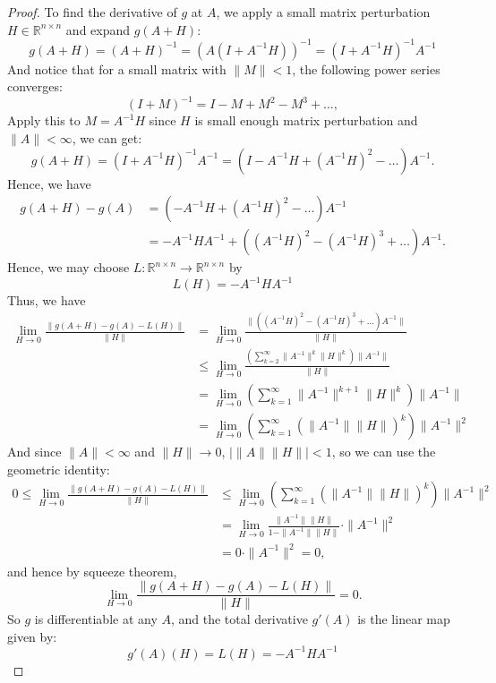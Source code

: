 \begin{proof}
    To find the derivative of $g$ at $A$, we apply a small matrix perturbation $H \in \mathbb{R}^{n \times n}$ and expand $g(A+H)$:
    \[
        g(A+H) = (A+H)^{-1} = (A(I+A^{-1}H))^{-1} = (I+A^{-1}H)^{-1}A^{-1}
    \]
    And notice that for a small matrix with $\| M \| < 1$, the following power series converges:
    \[
        (I + M)^{-1} = I - M + M^2 - M^3 + \dots,
    \]
    Apply this to $M = A^{-1}H$ since $H$ is small enough matrix perturbation and $\| A \| < \infty$, we can get:
    \[
        g(A+H) = (I+A^{-1}H)^{-1}A^{-1} = (I-A^{-1}H+(A^{-1}H)^2-\dots)A^{-1}.
    \]
    Hence, we have
    \[
        \begin{aligned}
            g(A+H)-g(A) &= (-A^{-1}H+(A^{-1}H)^2-\dots)A^{-1} \\ 
            &= -A^{-1}HA^{-1} + ((A^{-1}H)^2-(A^{-1}H)^3 +\dots)A^{-1}.
        \end{aligned}
    \]
    Hence, we may choose $L: \mathbb{R}^{n \times n} \to \mathbb{R}^{n \times n}$ by
    \[
        L(H) = -A^{-1}HA^{-1}
    \]
    Thus, we have
    \[
        \begin{aligned}
            \lim_{H \to 0} \frac{\|g(A+H) - g(A) - L(H) \|}{\| H \|} &= \lim_{H \to 0} \frac{\| ((A^{-1}H)^2-(A^{-1}H)^3 +\dots )A^{-1}\|}{\| H\|} \\
            &\le \lim_{H \to 0} \frac{(\sum_{k=2}^{\infty}\| A^{-1} \|^k\| H\|^k)\|A^{-1}\|}{\| H\|} \\
            &= \lim_{H \to 0} (\sum_{k=1}^{\infty}\| A^{-1} \|^{k+1}\| H\|^k)\|A^{-1}\| \\
            &= \lim_{H \to 0} (\sum_{k=1}^{\infty}(\| A^{-1} \|\| H\|)^k)\|A^{-1}\|^2
        \end{aligned}
    \]
    And since $\|A\| < \infty$ and $\| H\| \to 0$, $\lvert \| A\|\|H\| \rvert< 1$, so we can use the geometric identity:
    \[
        \begin{aligned}
            0 \le \lim_{H \to 0} \frac{\|g(A+H) - g(A) - L(H) \|}{\| H \|} &\le \lim_{H \to 0} (\sum_{k=1}^{\infty}(\| A^{-1} \|\| H\|)^k)\|A^{-1}\|^2 \\
            &= \lim_{H \to 0}\frac{\| A^{-1}\|\|H\|}{1-\| A^{-1}\|\|H\|} \cdot \| A^{-1}\|^2 \\
            &= 0 \cdot \| A^{-1}\|^2 = 0,
        \end{aligned}
    \]
    and hence by squeeze theorem,
    \[
        \lim_{H \to 0} \frac{\|g(A+H) - g(A) - L(H) \|}{\| H \|} = 0.
    \]
    So $g$ is differentiable at any $A$, and the total derivative $g'(A)$ is the linear map given by:
    \[
        g'(A)(H) = L(H) = -A^{-1}HA^{-1}
    \]
\end{proof}

